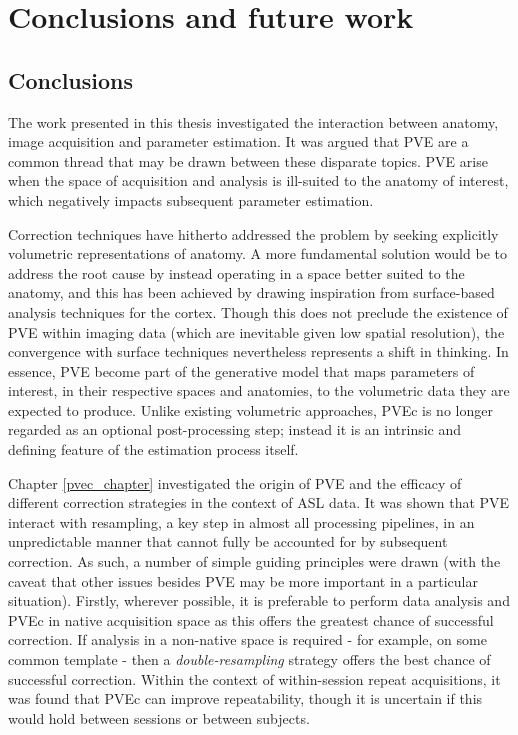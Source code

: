  

\chapter{Conclusions and future work}
\label{future_work_chapter}

\section{Conclusions}

The work presented in this thesis investigated the interaction between anatomy, image acquisition and parameter estimation. It was argued that PVE are a common thread that may be drawn between these disparate topics. PVE arise when the space of acquisition and analysis is ill-suited to the anatomy of interest, which negatively impacts subsequent parameter estimation. 

Correction techniques have hitherto addressed the problem by seeking explicitly volumetric representations of anatomy. A more fundamental solution would be to address the root cause by instead operating in a space better suited to the anatomy, and this has been achieved by drawing inspiration from surface-based analysis techniques for the cortex. Though this does not preclude the existence of PVE within imaging data (which are inevitable given low spatial resolution), the convergence with surface techniques nevertheless represents a shift in thinking. In essence, PVE become part of the generative model that maps parameters of interest, in their respective spaces and anatomies, to the volumetric data they are expected to produce. Unlike existing volumetric approaches, PVEc is no longer regarded as an optional post-processing step; instead it is an intrinsic and defining feature of the estimation process itself. 

Chapter \ref{pvec_chapter} investigated the origin of PVE and the efficacy of different correction strategies in the context of ASL data. It was shown that PVE interact with resampling, a key step in almost all processing pipelines, in an unpredictable manner that cannot fully be accounted for by subsequent correction. As such, a number of simple guiding principles were drawn (with the caveat that other issues besides PVE may be more important in a particular situation). Firstly, wherever possible, it is preferable to perform data analysis and PVEc in native acquisition space as this offers the greatest chance of successful correction. If analysis in a non-native space is required - for example, on some common template - then a \textit{double-resampling} strategy offers the best chance of successful correction. Within the context of within-session repeat acquisitions, it was found that PVEc can improve repeatability, though it is uncertain if this would hold between sessions or between subjects. 

